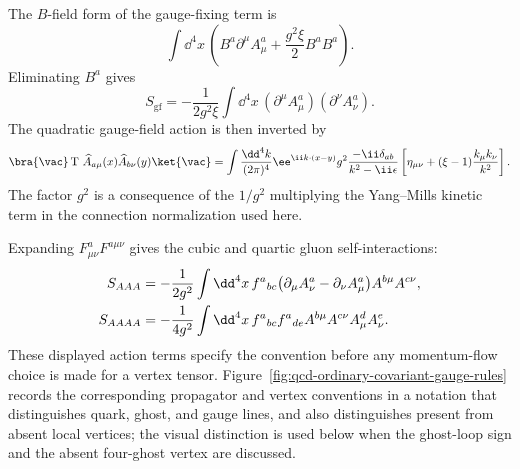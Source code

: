 The \(B\)-field form of the gauge-fixing term is
\[
  \int\dd^4x\,
  \left(
    B^a\partial^\mu A_\mu^a+\frac{g^2\xi}{2}B^aB^a
  \right).
\]
Eliminating \(B^a\) gives
\begin{equation}
  S_{\mathrm{gf}}
  =
  -\frac1{2g^2\xi}
  \int\dd^4x\,
  (\partial^\mu A_\mu^a)(\partial^\nu A_\nu^a).
  \label{eq:qcd-ordinary-covariant-gauge-term}
\end{equation}
The quadratic gauge-field action is then inverted by
\begin{equation}
  \bra{\vac}
  \operatorname T\,\widehat A_{a\mu}(x)\widehat A_{b\nu}(y)
  \ket{\vac}
  =
  \int\frac{\dd^4k}{(2\pi)^4}
  \ee^{\ii k\cdot(x-y)}
  g^2
  \frac{-\ii\delta_{ab}}{k^2-\ii\epsilon}
  \left[
    \eta_{\mu\nu}
    +(\xi-1)\frac{k_\mu k_\nu}{k^2}
  \right].
  \label{eq:qcd-ordinary-gluon-propagator}
\end{equation}
The factor \(g^2\) is a consequence of the \(1/g^2\) multiplying the
Yang--Mills kinetic term in the connection normalization used here.

Expanding \(F^a_{\mu\nu}F^{a\mu\nu}\) gives the cubic and quartic gluon
self-interactions:
\begin{align}
  S_{AAA}
  &=
  -\frac1{2g^2}
  \int\dd^4x\,
  f^a{}_{bc}
  \bigl(\partial_\mu A^a_\nu-\partial_\nu A^a_\mu\bigr)
  A^{b\mu} A^{c\nu} ,
  \notag\\
  S_{AAAA}
  &=
  -\frac1{4g^2}
  \int\dd^4x\,
  f^a{}_{bc}f^a{}_{de}
  A^{b\mu}A^{c\nu}A^d_{\mu}A^e_{\nu}.
  \label{eq:qcd-ordinary-gluon-self-interactions}
\end{align}
These displayed action terms specify the convention before any momentum-flow
choice is made for a vertex tensor.  Figure~\ref{fig:qcd-ordinary-covariant-gauge-rules}
records the corresponding propagator and vertex conventions in a notation that
distinguishes quark, ghost, and gauge lines, and also distinguishes present
from absent local vertices; the visual distinction is used below when the
ghost-loop sign and the absent four-ghost vertex are discussed.

